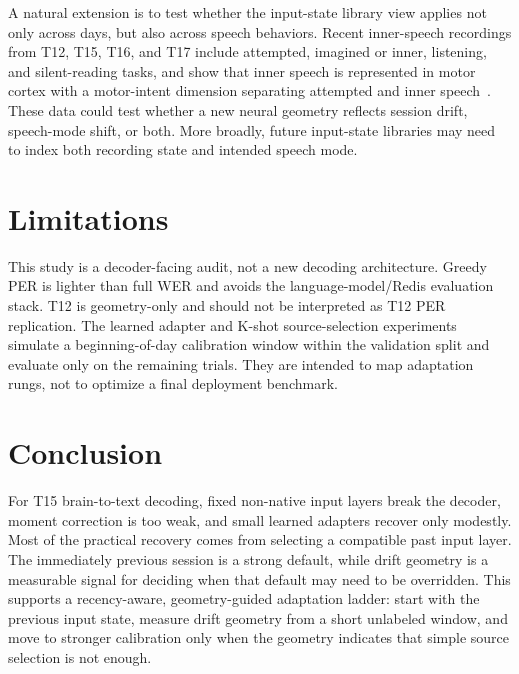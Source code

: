 \documentclass[10pt]{article}
\begin{document}
A natural extension is to test whether the input-state library view applies not
only across days, but also across speech behaviors. Recent inner-speech
recordings from T12, T15, T16, and T17 include attempted, imagined or inner,
listening, and silent-reading tasks, and show that inner speech is represented in
motor cortex with a motor-intent dimension separating attempted and inner
speech~\cite{kunz2025inner}. These data could test whether a new neural geometry
reflects session drift, speech-mode shift, or both. More broadly, future
input-state libraries may need to index both recording state and intended speech
mode.

\section{Limitations}
This study is a decoder-facing audit, not a new decoding architecture. Greedy PER
is lighter than full WER and avoids the language-model/Redis evaluation stack.
T12 is geometry-only and should not be interpreted as T12 PER replication. The
learned adapter and K-shot source-selection experiments simulate a
beginning-of-day calibration window within the validation split and evaluate only
on the remaining trials. They are intended to map adaptation rungs, not to
optimize a final deployment benchmark.

\section{Conclusion}
For T15 brain-to-text decoding, fixed non-native input layers break the decoder,
moment correction is too weak, and small learned adapters recover only modestly.
Most of the practical recovery comes from selecting a compatible past input
layer. The immediately previous session is a strong default, while drift geometry
is a measurable signal for deciding when that default may need to be overridden.
This supports a recency-aware, geometry-guided adaptation ladder: start with the
previous input state, measure drift geometry from a short unlabeled window, and
move to stronger calibration only when the geometry indicates that simple source
selection is not enough.
\end{document}
